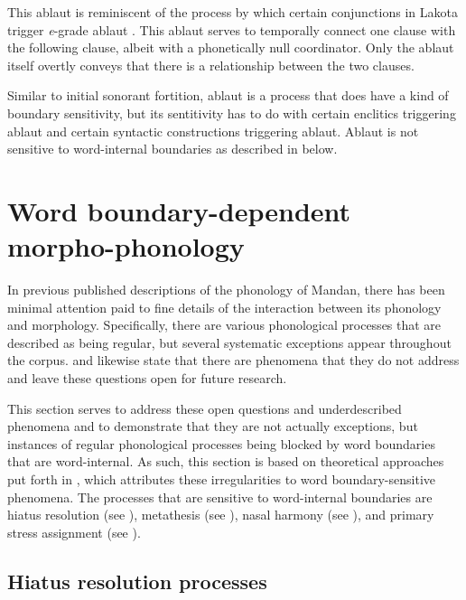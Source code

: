 This ablaut is reminiscent of the process by which certain conjunctions in Lakota trigger \textit{e}-grade ablaut \citep[754]{ullrich2011}. This ablaut serves to temporally connect one clause with the following clause, albeit with a phonetically null coordinator. Only the ablaut itself overtly conveys that there is a relationship between the two clauses.

Similar to initial sonorant fortition, ablaut is a process that does have a kind of boundary sensitivity, but its sentitivity has to do with certain enclitics triggering ablaut and certain syntactic constructions triggering ablaut. Ablaut is not sensitive to word-internal boundaries as described in  below.

\section{Word boundary-dependent morpho-phonology}\label{boundarydependent}
\largerpage
In previous published descriptions of the phonology of Mandan, there has been minimal attention paid to fine details of the interaction between its phonology and morphology. Specifically, there are various phonological processes that are described as being regular, but several systematic exceptions appear throughout the corpus. \citet[35]{hollow1970} and \citet[12]{mixco1997a} likewise state that there are phenomena that they do not address and leave these questions open for future research.


This section serves to address these open questions and underdescribed phenomena and to demonstrate that they are not actually exceptions, but instances of regular phonological processes being blocked by word boundaries that are word-internal. As such, this section is based on theoretical approaches put forth in \citet{kasak2019}, which attributes these irregularities to word boundary-sensitive phenomena. The processes that are sensitive to word-internal boundaries are hiatus resolution (see ), metathesis (see ), nasal harmony (see ), and primary stress assignment (see ).

\subsection{Hiatus resolution processes}\label{epentheticprocesses}

